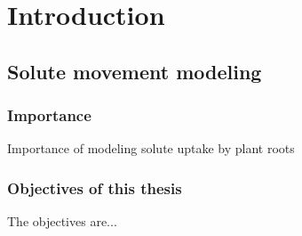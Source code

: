 \section{Introduction}
\subsection{Solute movement modeling}
\begin{frame}
\frametitle{Importance}
Importance of modeling solute uptake by plant roots
\end{frame}
\begin{frame}
\frametitle{Objectives of this thesis}
The objectives are...
\end{frame}


